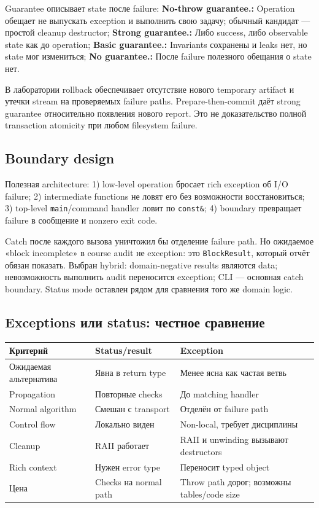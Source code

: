 Guarantee описывает state после failure:
\textbf{No-throw guarantee.:} Operation обещает не выпускать exception и выполнить свою задачу; обычный кандидат --- простой cleanup destructor; \textbf{Strong guarantee.:} Либо success, либо observable state как до operation; \textbf{Basic guarantee.:} Invariants сохранены и leaks нет, но state мог измениться; \textbf{No guarantee.:} После failure полезного обещания о state нет.

В лаборатории rollback обеспечивает отсутствие нового temporary artifact и
утечки stream на проверяемых failure paths. Prepare-then-commit даёт strong
guarantee относительно появления нового report. Это не доказательство полной
transaction atomicity при любом filesystem failure.

\subsection{Boundary design}

Полезная architecture:
1) low-level operation бросает rich exception об I/O failure; 2) intermediate functions не ловят его без возможности восстановиться; 3) top-level \texttt{main}/command handler ловит по \texttt{const\&}; 4) boundary превращает failure в сообщение и nonzero exit code.

Catch после каждого вызова уничтожил бы отделение failure path. Но ожидаемое
«block incomplete» в course audit не exception: это \texttt{BlockResult}, который
отчёт обязан показать. Выбран hybrid: domain-negative results являются data;
невозможность выполнить audit переносится exception; CLI --- основная catch
boundary. Status mode оставлен рядом для сравнения того же domain logic.

\subsection{Exceptions или status: честное сравнение}

\begin{center}
\begin{tabularx}{\textwidth}{L{0.23\textwidth}YY}
\toprule
Критерий & Status/result & Exception \\
\midrule
Ожидаемая альтернатива & Явна в return type & Менее ясна как частая ветвь \\
Propagation & Повторные checks & До matching handler \\
Normal algorithm & Смешан с transport & Отделён от failure path \\
Control flow & Локально виден & Non-local, требует дисциплины \\
Cleanup & RAII работает & RAII и unwinding вызывают destructors \\
Rich context & Нужен error type & Переносит typed object \\
Цена & Checks на normal path & Throw path дорог; возможны tables/code size \\
\bottomrule
\end{tabularx}
\end{center}

